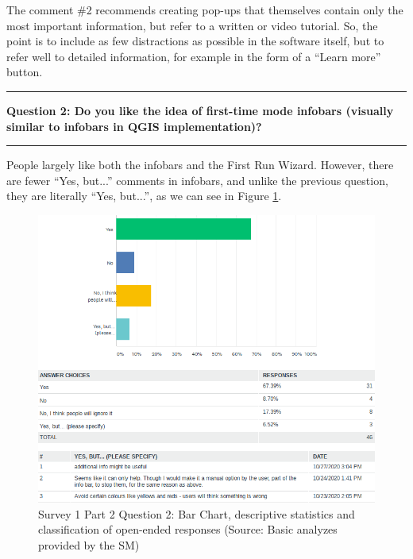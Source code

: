 \documentclass[a4paper,10pt,twoside]{article}
\begin{document}
\noindent The comment \#2 recommends creating pop-ups that themselves
contain only the most important information, but refer to a written
or video tutorial. So, the point is to include as few distractions as
possible in the software itself, but to refer well to detailed
information, for example in the form of a ``Learn more'' button.

\par\noindent\rule{\textwidth}{0.4pt}
\noindent \textbf{Question 2: Do you like the idea of first-time mode infobars (visually similar to infobars in QGIS implementation)?}
\par\noindent\rule{\textwidth}{0.4pt}

\noindent People largely like both the infobars and the First Run Wizard. However, there are fewer ``Yes, but...'' comments in infobars, and unlike the previous question, they are literally ``Yes, but...'', as we can see in Figure \ref{fig:survey1_part2_question2_all}. 

\vspace{0.3cm}
\begin{figure}[hbt!] 
\begin{center}
\includegraphics[width=15.5cm]{../surveys/analyzed_data/survey1_part2_question2_all.png} 
\caption[Survey 1 Part 2 Question 2: Bar Chart descriptive statistics and classification of open-ended responses]{Survey 1 Part 2 Question 2: Bar Chart, descriptive statistics and classification of  open-ended responses (Source: Basic analyzes provided by the SM)}
\label{fig:survey1_part2_question2_all}
\end{center}
\end{figure}
\end{document}
